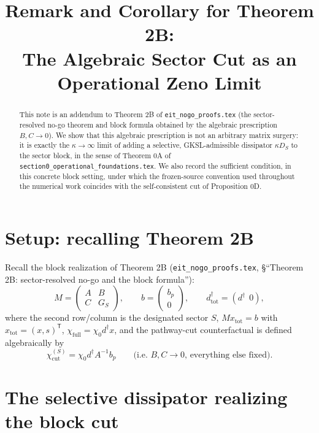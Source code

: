 \documentclass[11pt]{article}
\title{Remark and Corollary for Theorem 2B:\\
The Algebraic Sector Cut as an Operational Zeno Limit}
\author{}
\date{}
\begin{document}
\maketitle

\begin{abstract}
This note is an addendum to Theorem 2B of \texttt{eit\_nogo\_proofs.tex}
(the sector-resolved no-go theorem and block formula obtained by the
algebraic prescription $B,C\to0$). We show that this algebraic
prescription is not an arbitrary matrix surgery: it is exactly the
$\kappa\to\infty$ limit of adding a selective, GKSL-admissible
dissipator $\kappa D_S$ to the sector block, in the sense of Theorem 0A
of \texttt{section0\_operational\_foundations.tex}. We also record the
sufficient condition, in this concrete block setting, under which the
frozen-source convention used throughout the numerical work coincides
with the self-consistent cut of Proposition 0D.
\end{abstract}

\section{Setup: recalling Theorem 2B}

Recall the block realization of Theorem 2B (\texttt{eit\_nogo\_proofs.tex},
\S ``Theorem 2B: sector-resolved no-go and the block formula''):
\[
M=\begin{pmatrix}A&B\\ C&G_S\end{pmatrix},
\qquad
b=\begin{pmatrix}b_p\\0\end{pmatrix},
\qquad
d_{\mathrm{tot}}^\dagger=(d^\dagger\ \ 0),
\]
where the second row/column is the designated sector $S$, $Mx_{\mathrm{tot}}=b$
with $x_{\mathrm{tot}}=(x,s)^{\mathsf T}$, $\chi_{\mathrm{full}}=\chi_0d^\dagger x$,
and the pathway-cut counterfactual is defined algebraically by
\[
\chi_{\mathrm{cut}}^{(S)}=\chi_0d^\dagger A^{-1}b_p
\qquad\text{(i.e.\ $B,C\to0$, everything else fixed).}
\]

\section{The selective dissipator realizing the block cut}
\end{document}
